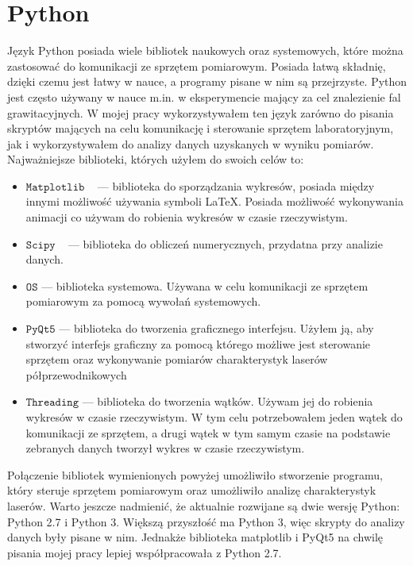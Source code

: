 \section{Python}
Język Python posiada wiele bibliotek naukowych oraz systemowych, które można zastosować do komunikacji ze sprzętem pomiarowym.
Posiada łatwą składnię, dzięki czemu jest łatwy w nauce, a programy pisane w nim są przejrzyste.
Python jest często używany w nauce m.in. w eksperymencie mający za cel znalezienie fal grawitacyjnych.
W mojej pracy wykorzystywałem ten język zarówno do pisania skryptów mających na celu komunikację i sterowanie sprzętem laboratoryjnym,
jak i wykorzystywałem do analizy danych uzyskanych w wyniku pomiarów.
Najważniejsze biblioteki, których użyłem do swoich celów to:
\begin{itemize}
\item $\mathtt{Matplotlib}$ ~\cite{matplotlib_book} --- biblioteka do sporządzania wykresów, posiada między innymi możliwość używania symboli \LaTeX.
Posiada możliwość wykonywania animacji co używam do robienia wykresów w czasie rzeczywistym.
\item $\mathtt{Scipy}$ ~\cite{SciPy_book} --- biblioteka do obliczeń numerycznych, przydatna przy analizie danych.
\item $\mathtt{OS}$ --- biblioteka systemowa. Używana w celu komunikacji ze sprzętem pomiarowym za pomocą wywołań systemowych.
\item $\mathtt{PyQt5}$ --- biblioteka do tworzenia graficznego interfejsu. Użyłem ją, aby stworzyć interfejs graficzny za pomocą
którego możliwe jest sterowanie sprzętem oraz wykonywanie pomiarów charakterystyk laserów półprzewodnikowych
\item $\mathtt{Threading}$ --- biblioteka do tworzenia wątków. Używam jej do robienia wykresów w czasie rzeczywistym.
W tym celu potrzebowałem jeden wątek do komunikacji ze sprzętem, a drugi wątek w tym samym czasie
na podstawie zebranych danych tworzył wykres w czasie rzeczywistym.
\end{itemize}
Połączenie bibliotek wymienionych powyżej umożliwiło stworzenie programu, który steruje sprzętem pomiarowym oraz
umożliwiło analizę charakterystyk laserów.
Warto jeszcze nadmienić, że aktualnie rozwijane są dwie wersję Python: Python 2.7 i Python 3. Większą przyszłość ma Python 3,
więc skrypty do analizy danych były pisane w nim. Jednakże biblioteka matplotlib i PyQt5 na chwilę pisania mojej
pracy lepiej współpracowała z Python 2.7.
